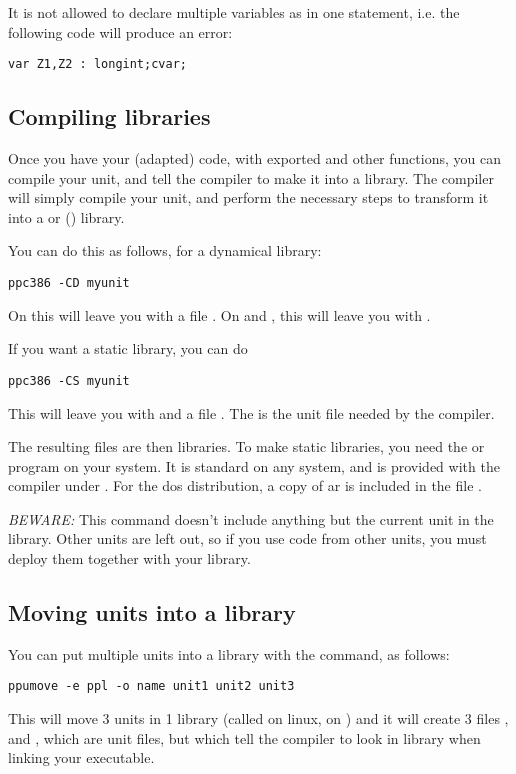 \documentclass{report}
\begin{document}
It is not allowed to declare multiple variables as  in one
statement, i.e. the following code will produce an error:
\begin{verbatim}
var Z1,Z2 : longint;cvar;
\end{verbatim}

\subsection {Compiling libraries}

Once you have your (adapted) code, with exported and other functions,
you can compile your unit, and tell the compiler to make it into a library.
The compiler will simply compile your unit, and perform the necessary steps
to transform it into a  or  () library.

You can do this as follows, for a dynamical library:
\begin{verbatim}
ppc386 -CD myunit
\end{verbatim}
On \linux this will leave you with a file . On \windows
and \ostwo, this will leave you with .

If you want a static library, you can do
\begin{verbatim}
ppc386 -CS myunit
\end{verbatim}
This will leave you with  and a file .
The  is the unit file needed by the \fpc compiler.

The resulting files are then libraries. To make static libraries, you need
the  or  program on your system. It is standard on any
\linux system, and is provided with the  compiler under \dos.
For the dos distribution, a copy of ar is included in the file
.

{\em BEWARE:} This command doesn't include anything but the current unit in
the library. Other units are left out, so if you use code from other units,
you must deploy them together with your library.

\subsection{Moving units into a library}
You can put multiple units into a library with the  command, as
follows:

\begin{verbatim}
ppumove -e ppl -o name unit1 unit2 unit3
\end{verbatim}
This will move 3 units in 1 library (called  on linux,
 on \windows) and it will create 3 files ,
 and , which are unit files, but which tell
the compiler to look in library  when linking your executable.
\end{document}
